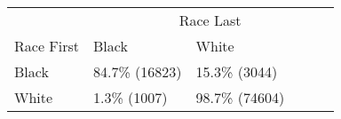 \begin{table}[H]
\centering\begingroup\fontsize{9}{11}\selectfont

\begin{tabular}{lll}
\toprule
\multicolumn{1}{c}{} & \multicolumn{5}{c}{Race Last} \\
\cmidrule(l{3pt}r{3pt}){2-6}
Race First & Black & White\\
\midrule
Black & 84.7\% (16823) & 15.3\%  (3044)\\
White & 1.3\%  (1007) & 98.7\% (74604)\\
\bottomrule
\end{tabular}
\endgroup{}
\end{table}
